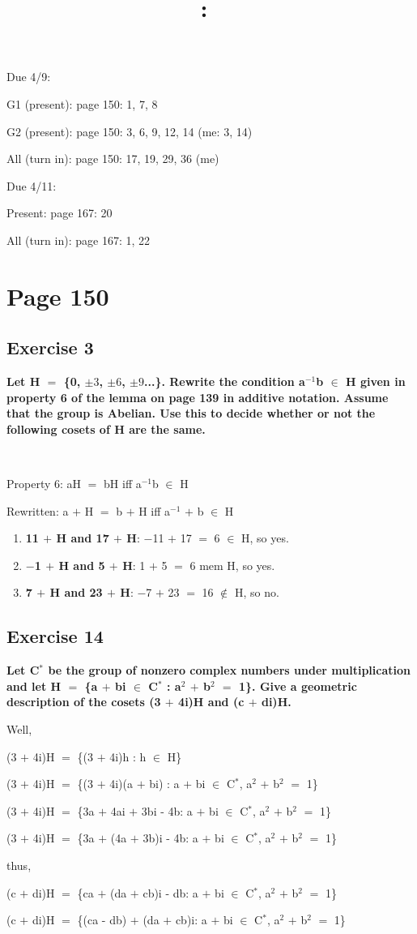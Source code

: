 \documentclass{article}
\title{
    \vspace{2in}
    \textmd{\textbf{\hmwkClass:\ \hmwkTitle}}\\
    \normalsize\vspace{0.1in}\small\vspace{0.1in}\large{\textit{\hmwkClassInstructor}}
    \vspace{3in}
}
\author{\hmwkAuthorName}
\date{}
\newcommand{\mt}[1]{\ensuremath{#1}}
\newcommand\bsc[2][\DefaultOpt]{%
  \def\DefaultOpt{#2}%
  \section[#1]{#2}%
}
\newcommand\ssc[2][\DefaultOpt]{%
  \def\DefaultOpt{#2}%
  \subsection[#1]{#2}%
}
\newcommand{\balist}{\begin{enumerate}[label=\alph*.]}
\newcommand{\elist}{\end{enumerate}}
\newcommand{\mem}{\mt{\in} }
\newcommand{\bk}[1]{\{#1\}}
\newcommand{\ps}{\mt{+} }
\newcommand{\eql}{\mt{=} }
\newcommand{\uf}[2]{#1\mt{^{#2}}}
\begin{document}
Due 4/9:

G1 (present): page 150: 1, 7, 8

G2 (present): page 150: 3, 6, 9, 12, 14 (me: 3, 14)

All (turn in): page 150: 17, 19, 29, 36 (me)

Due 4/11:

Present: page 167: 20

All (turn in): page 167: 1, 22

\bsc{Page 150}{
\ssc{Exercise 3}{

\textbf{Let H \eql \bk{0, \mt{\pm3}, \mt{\pm6}, \mt{\pm9}...}. Rewrite the condition \uf{a}{-1}b \mem H given in property 6 of the lemma on page 139 in additive notation. Assume that the group is Abelian. Use this to decide whether or not the following cosets of H are the same.}

\

Property 6: aH \eql bH iff \uf{a}{-1}b \mem H

Rewritten: a \ps H \eql b \ps H iff \uf{a}{-1} \ps b \mem H

\balist
\item \textbf{11 \ps H and 17 \ps H}: \mt{-}11 \ps 17 \eql 6 \mem H, so yes.
\item \textbf{\mt{-}1 \ps H and 5 \ps H}: 1 \ps 5 \eql 6 mem H, so yes.
\item \textbf{7 \ps H and 23 \ps H}: \mt{-}7 \ps 23 \eql 16 $\not\in$ H, so no.
\elist

}
\ssc{Exercise 14}{
\textbf{Let \uf{C}{*} be the group of nonzero complex numbers under multiplication and let H \eql \bk{a \ps bi \mem \uf{C}{*} : \uf{a}{2} \ps \uf{b}{2} \eql 1}. Give a geometric description of the cosets (3 \ps 4i)H and (c \ps di)H.}

Well,

(3 \ps 4i)H \eql \bk{(3 \ps 4i)h : h \mem H}


(3 \ps 4i)H \eql \bk{(3 \ps 4i)(a \ps bi) : a \ps bi \mem \uf{C}{*}, \uf{a}{2} \ps \uf{b}{2} \eql 1}

(3 \ps 4i)H \eql \bk{3a \ps 4ai \ps 3bi - 4b: a \ps bi \mem \uf{C}{*}, \uf{a}{2} \ps \uf{b}{2} \eql 1}

(3 \ps 4i)H \eql \bk{3a \ps (4a \ps 3b)i - 4b: a \ps bi \mem \uf{C}{*}, \uf{a}{2} \ps \uf{b}{2} \eql 1}

thus,

(c \ps di)H \eql \bk{ca \ps (da \ps cb)i - db: a \ps bi \mem \uf{C}{*}, \uf{a}{2} \ps \uf{b}{2} \eql 1}

(c \ps di)H \eql \bk{(ca  - db) \ps (da \ps cb)i: a \ps bi \mem \uf{C}{*}, \uf{a}{2} \ps \uf{b}{2} \eql 1}

}}
\end{document}
